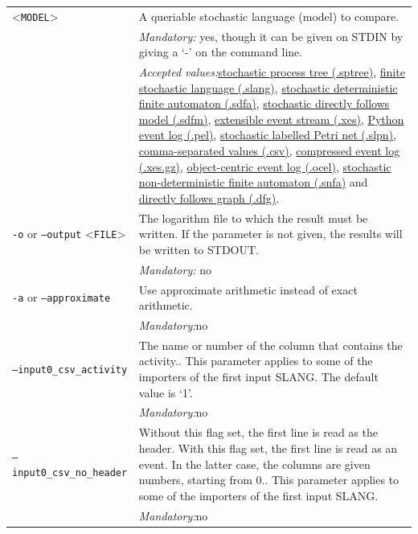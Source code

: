 {\begin{tabularx}{\linewidth}{lX}
<\texttt{MODEL}>&A queriable stochastic language (model) to compare.\\
&\textit{Mandatory:} \quad yes, though it can be given on STDIN by giving a `-' on the command line.\\
&\textit{Accepted values:}\quad \hyperref[filehandler:stochastic process tree]{stochastic process tree (.sptree)}, \hyperref[filehandler:finite stochastic language]{finite stochastic language (.slang)}, \hyperref[filehandler:stochastic deterministic finite automaton]{stochastic deterministic finite automaton (.sdfa)}, \hyperref[filehandler:stochastic directly follows model]{stochastic directly follows model (.sdfm)}, \hyperref[filehandler:extensible event stream]{extensible event stream (.xes)}, \hyperref[filehandler:Python event log]{Python event log (.pel)}, \hyperref[filehandler:stochastic labelled Petri net]{stochastic labelled Petri net (.slpn)}, \hyperref[filehandler:comma-separated values]{comma-separated values (.csv)}, \hyperref[filehandler:compressed event log]{compressed event log (.xes.gz)}, \hyperref[filehandler:object-centric event log]{object-centric event log (.ocel)}, \hyperref[filehandler:stochastic non-deterministic finite automaton]{stochastic non-deterministic finite automaton (.snfa)} and \hyperref[filehandler:directly follows graph]{directly follows graph (.dfg)}.\\
\texttt{-o} or \texttt{--output} <\texttt{FILE}> &
The logarithm file to which the result must be written. If the parameter is not given, the results will be written to STDOUT.\\
&\textit{Mandatory:} \quad no\\
\texttt{-a} or \texttt{--approximate} & Use approximate arithmetic instead of exact arithmetic.\\
&\textit{Mandatory:}\quad no\\
\texttt{--input0\_csv\_activity} & The name or number of the column that contains the activity.. This parameter applies to some of the importers of the first input SLANG. The default value is `1'.\\
&\textit{Mandatory:}\quad no\\
\texttt{--input0\_csv\_no\_header} & Without this flag set, the first line is read as the header. 
    With this flag set, the first line is read as an event. In the latter case, the columns are given numbers, starting from 0.. This parameter applies to some of the importers of the first input SLANG. \\
&\textit{Mandatory:}\quad no\\

\end{tabularx}}

